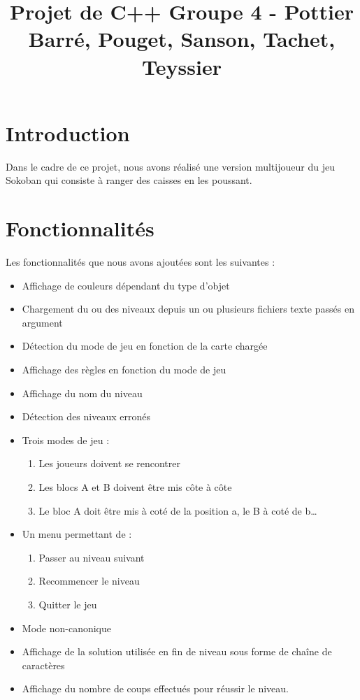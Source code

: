 \documentclass{article}
\begin{document}
\title{Projet de C++ Groupe 4 - Pottier Barré, Pouget, Sanson, Tachet, Teyssier}
\date{}
\maketitle

\section{Introduction}

Dans le cadre de ce projet, nous avons réalisé une version multijoueur du jeu Sokoban qui consiste à ranger des caisses en les poussant. \\

\section{Fonctionnalités}

Les fonctionnalités que nous avons ajoutées sont les suivantes :
\begin{itemize}
    \item Affichage de couleurs dépendant du type d'objet
    \item Chargement du ou des niveaux depuis un ou plusieurs fichiers texte passés en argument
    \item Détection du mode de jeu en fonction de la carte chargée
    \item Affichage des règles en fonction du mode de jeu
    \item Affichage du nom du niveau
    \item Détection des niveaux erronés
    \item Trois modes de jeu :
    \begin{enumerate}
        \item Les joueurs doivent se rencontrer
        \item Les blocs A et B doivent être mis côte à côte
        \item Le bloc A doit être mis à coté de la position a, le B à coté de b…
    \end{enumerate}
    \item Un menu permettant de :
    \begin{enumerate}
        \item Passer au niveau suivant
        \item Recommencer le niveau
        \item Quitter le jeu
    \end{enumerate}
    \item Mode non-canonique
    \item Affichage de la solution utilisée en fin de niveau sous forme de chaîne de caractères
    \item Affichage du nombre de coups effectués pour réussir le niveau.
\end{itemize}
\end{document}

